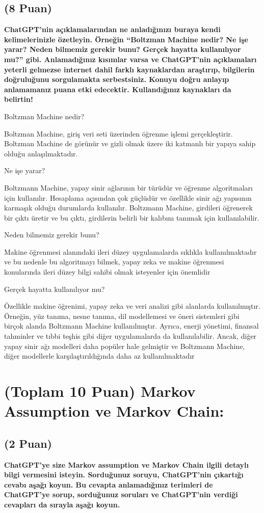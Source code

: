 \documentclass[11pt]{article}
\begin{document}
\subsection{(8 Puan)} \textbf{ChatGPT’nin açıklamalarından ne anladığınızı buraya kendi kelimelerinizle özetleyin. Örneğin ``Boltzman Machine nedir? Ne işe yarar? Neden bilmemiz gerekir bunu? Gerçek hayatta kullanılıyor mu?'' gibi. Anlamadığınız kısımlar varsa ve ChatGPT’nin açıklamaları yeterli gelmezse internet dahil farklı kaynaklardan araştırıp, bilgilerin doğruluğunu sorgulamakta serbestsiniz. Konuyu doğru anlayıp anlamamanız puana etki edecektir. Kullandığınız kaynakları da belirtin!}

Boltzman Machine nedir?

Boltzman Machine, giriş veri seti üzerinden öğrenme işlemi gerçekleştirir. Boltzman Machine de görünür ve gizli olmak üzere iki katmanlı bir yapıya sahip olduğu anlaşılmaktadır.

Ne işe yarar?

Boltzmann Machine, yapay sinir ağlarının bir türüdür ve öğrenme algoritmaları için kullanılır. Hesaplama açısından çok güçlüdür ve özellikle sinir ağı yapısının karmaşık olduğu durumlarda kullanılır. Boltzmann Machine, girdileri öğrenerek bir çıktı üretir ve bu çıktı, girdilerin belirli bir kalıbını tanımak için kullanılabilir.

Neden bilmemiz gerekir bunu?

Makine öğrenmesi alanındaki ileri düzey uygulamalarda sıklıkla kullanılmaktadır ve bu nedenle bu algoritmayı bilmek, yapay zeka ve makine öğrenmesi konularında ileri düzey bilgi sahibi olmak isteyenler için önemlidir

Gerçek hayatta kullanılıyor mu?

Özellikle makine öğrenimi, yapay zeka ve veri analizi gibi alanlarda kullanılmıştır. Örneğin, yüz tanıma, nesne tanıma, dil modellemesi ve öneri sistemleri gibi birçok alanda Boltzmann Machine kullanılmıştır. Ayrıca, enerji yönetimi, finansal tahminler ve tıbbi teşhis gibi diğer uygulamalarda da kullanılabilir. Ancak, diğer yapay sinir ağı modelleri daha popüler hale gelmiştir ve Boltzmann Machine, diğer modellerle karşılaştırıldığında daha az kullanılmaktadır

\section{(Toplam 10 Puan) Markov Assumption ve Markov Chain:}

\subsection{(2 Puan)} \textbf{ChatGPT’ye size Markov assumption ve Markov Chain ilgili detaylı bilgi vermesini isteyin. Sorduğunuz soruyu, ChatGPT'nin çıkartığı cevabı aşağı koyun. Bu cevapta anlamadığınız terimleri de ChatGPT’ye sorup, sorduğunuz soruları ve ChatGPT’nin verdiği cevapları da sırayla aşağı koyun.}
\end{document}
